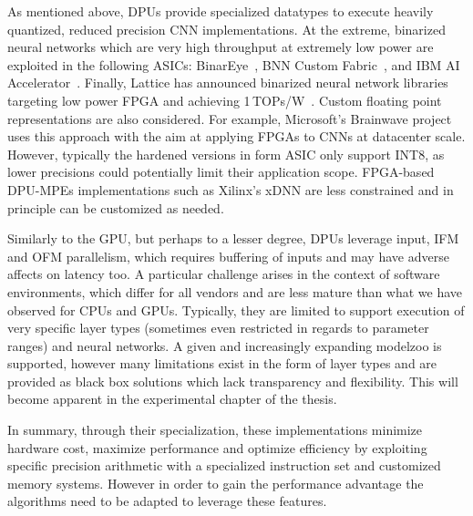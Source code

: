 As mentioned above, DPUs provide specialized datatypes to execute heavily quantized, reduced precision CNN implementations.
At the extreme, binarized neural networks which are very high throughput at extremely low power are exploited in the following ASICs: BinarEye~\cite{binareye}, BNN Custom Fabric~\cite{ando2017brein}, and IBM AI Accelerator~\cite{IBMAI}. Finally, Lattice has announced binarized neural network libraries targeting low power FPGA and achieving 1\,TOPs/W~\cite{lattice-bnn}.
Custom floating point representations are also considered. For example, Microsoft's Brainwave project~\cite{chung2018serving} uses this approach with the aim at applying FPGAs to CNNs at datacenter scale.
However, typically the hardened versions in form ASIC only support INT8, as lower precisions could potentially limit their application scope. FPGA-based DPU-MPEs implementations such as Xilinx's xDNN are less constrained and in principle can be customized as needed.

Similarly to the GPU, but perhaps to a lesser degree, DPUs leverage input, IFM and OFM parallelism, which requires buffering of inputs and may have adverse affects on latency too.
A particular challenge arises in the context of software environments, which differ for all vendors and are less mature than what we have observed for CPUs and GPUs. Typically, they are limited to support execution of very specific layer types (sometimes even restricted in regards to parameter ranges) and neural networks. A given and increasingly expanding modelzoo is supported, however many limitations exist in the form of layer types and are provided as black box solutions which lack transparency and flexibility. This will become apparent in the experimental chapter of the thesis.

In summary, through their specialization, these implementations minimize hardware cost, maximize performance and optimize efficiency by exploiting specific precision arithmetic with a specialized instruction set and customized memory systems. However in order to gain the performance advantage the algorithms need to be adapted to leverage these features. 

